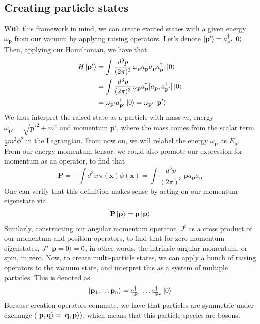 \documentclass[11pt, oneside]{article}   	%
\theoremstyle{newline}
\theoremstyle{newline}
\theoremstyle{newline}
\theoremstyle{newline}
\theoremstyle{newline}
\newcommand{\intp}{ \int \frac{ d^3 p }{ (2 \pi)^3 } \, }
\newcommand{\ann}[1]{a_{ \mathbf{ #1 }}}
\newcommand{\crea}[1]{a^\dagger_{ \mathbf{ #1 }}}
\newcommand{\ve}[1]{ \mathbf{ #1 } }
\newcommand{\freq}[1]{\omega_\mathbf{ #1} }
\newcommand{\scal}[1]{\phi ( \mathbf{ #1 })}
\newcommand{\mom}[1]{ \pi (\mathbf{ #1 })}
\begin{document}
\subsection{Creating particle states} 
With this framework in mind, we can create excited states with a given energy $\freq{ p }$ from our vacuum by applying raising operators. 
Let's denote $\ket { \mathbf{ p ' } }  = \crea{ p ' } \ket{ 0 } $. Then, applying our Hamiltonian, we have that 
\begin{align*} 
H \ket { \mathbf{ p } '} & = \intp \freq{ p } \crea{ p} \ann{ p} \crea{ p' } \ket{0} \\
&= \intp \freq{ p} \crea{ p } [ \ann{ p }, \crea{ p'} ]\ket{ 0 } \\
&= \freq{ p '} \crea{ p ' } \ket{ 0 } = \freq{  p ' } \ket{ \mathbf{ p }'} 
\end{align*} 
We thus interpret the raised state as  a particle with mass $m$, energy $ \freq{ p' }  = \sqrt{ \ve{ p ' }^2 + m^ 2 }$  and momentum $ \mathbf{ p' } $, where the mass comes from the scalar term $\frac{ 1}{ 2} m^2 \phi^ 2 $ in the Lagrangian. From now on, we will relabel the energy $\freq{ p }$ as $E_\ve{ p } $. From our energy momentum tensor, we could also promote our expression for momentum as an operator, to find that 
\[ 
\ve{ P } =  - \int d^3 x\,  \mom{x} \scal{x}  = \intp \ve{ p} \crea{ p} \ann{ p} 
\] 
One can verify that this definition makes sense by acting on our momentum eigenstate via 
\[ 
\ve{ P } \ket{ \ve{ p}}  = \ve{ p } \ket{ \ve{ p } } 
\] Similarly, constructing our angular momentum operator, $J^i $ as a cross product of our momentum and position operators, to find that for zero momentum eigenstates, $J^i \ket{ \ve{ p } = 0 } = 0 $, in other words, the intrinsic angular momentum, or spin, in zero. Now, to create multi-particle states, we can apply a bunch of raising operators to the vacuum state, and interpret this as a system of multiple particles. 
This is denoted as 
\[ 
\ket{ \ve{ p }_1, \dots \ve{ p} _n }  = \crea{ p_1 } \dots \crea{ p_ n } \ket{ 0} 
\] Because creation operators commute, we have that particles are symmetric under exchange ($ \ket { \ve{ p }, \ve{ q}} =  \ket { \ve{ q}, \ve{ p}})$, which means that this particle species are bosons. 
\end{document}
